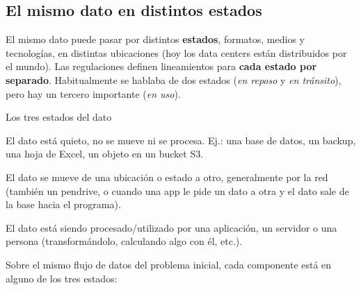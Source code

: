 \documentclass[11pt,a4paper]{article}
\begin{document}
\subsection{El mismo dato en distintos estados}

El mismo dato puede pasar por distintos \textbf{estados}, formatos, medios y tecnologías, en
distintas ubicaciones (hoy los data centers están distribuidos por el mundo). Las regulaciones
definen lineamientos para \textbf{cada estado por separado}. Habitualmente se hablaba de dos
estados (\emph{en reposo} y \emph{en tránsito}), pero hay un tercero importante (\emph{en uso}).

\begin{defbox}{Los tres estados del dato}
\begin{description}[leftmargin=0pt,itemsep=2pt,topsep=2pt]
  \item[\textbf{Data at-rest (en reposo).}] El dato está quieto, no se mueve ni se procesa.
        Ej.: una base de datos, un backup, una hoja de Excel, un objeto en un bucket S3.
  \item[\textbf{Data in-motion (en movimiento/tránsito).}] El dato se mueve de una ubicación o
        estado a otro, generalmente por la red (también un pendrive, o cuando una app le pide
        un dato a otra y el dato sale de la base hacia el programa).
  \item[\textbf{Data in-use (en uso).}] El dato está siendo procesado/utilizado por una
        aplicación, un servidor o una persona (transformándolo, calculando algo con él, etc.).
\end{description}
\end{defbox}

\noindent Sobre el mismo flujo de datos del problema inicial, cada componente está en alguno de
los tres estados:
\end{document}
